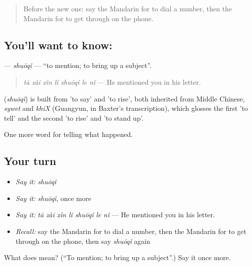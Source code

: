 \begin{quote}
Before the new one: say the Mandarin for to dial a number, then the Mandarin for to get through on the phone.
\end{quote}

\subsection*{You'll want to know: }
\textbf{} — \emph{shuōqǐ} — \textquotedblleft{}to mention; to bring up a subject\textquotedblright{}.

\begin{quote}
\textbf{} \emph{tā zài xìn lǐ shuōqǐ le nǐ} — He mentioned you in his letter.
\end{quote}

\begin{cousinweb}
\textbf{} (\emph{shuōqǐ}) is built from  'to say' and  'to rise', both inherited from Middle Chinese, \emph{sywet} and \emph{khiX} (Guangyun, in Baxter's transcription), which glosses the first 'to tell' and the second 'to rise' and 'to stand up'.
\end{cousinweb}

\begin{grammarlens}[title={What you've built}]
One more word for telling what happened.
\end{grammarlens}

\subsection*{Your turn}
\begin{itemize}
\raggedright
  \item \emph{Say it:} \emph{shuōqǐ}
  \item \emph{Say it:} \emph{shuōqǐ}, once more
  \item \emph{Say it:} \emph{tā zài xìn lǐ shuōqǐ le nǐ} — He mentioned you in his letter.
  \item \emph{Recall:} say the Mandarin for to dial a number, then the Mandarin for to get through on the phone, then say \emph{shuōqǐ} again
\end{itemize}

\begin{tcolorbox}[breakable,colback=teal!4,colframe=teal!35!black,title={Before you move on}]
What does  mean? (\textquotedblleft{}To mention; to bring up a subject\textquotedblright{}.) Say it once more.
\end{tcolorbox}
